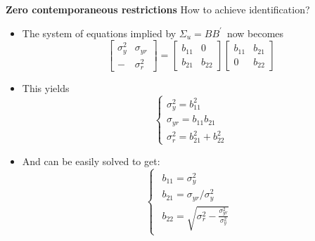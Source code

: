 \documentclass[10pt,english,t,aspectratio=169,ignorenonframetext]{beamer}
\begin{document}
\begin{frame}
{\textbf{Zero contemporaneous restrictions }}{How to achieve identification?}
\vspace{-.25cm}

\begin{itemize}
\item The system of equations implied by $\Sigma _{u}=BB^{\prime }$\ now
becomes 
\begin{equation*}
\left[ 
\begin{array}{cc}
\sigma _{y}^{2} & \sigma _{yr} \\ 
- & \sigma _{r}^{2}%
\end{array}%
\right] =\left[ 
\begin{array}{cc}
b_{11} & 0 \\ 
b_{21} & b_{22}%
\end{array}%
\right] \left[ 
\begin{array}{cc}
b_{11} & b_{21} \\ 
0 & b_{22}%
\end{array}%
\right]
\end{equation*}
\pause

\item This yields%
\begin{equation*}
\left\{ 
\begin{array}{l}
\sigma _{y}^{2}=b_{11}^{2} \\ 
\sigma _{yr}=b_{11}b_{21} \\ 
\sigma _{r}^{2}=b_{21}^{2}+b_{22}^{2}%
\end{array}%
\right.
\end{equation*}
\pause

\item And can be easily solved to get:%
\begin{equation*}
\left\{ 
\begin{array}{l}
\begin{array}{c}
b_{11}=\sigma _{y}^{2} \\ 
b_{21}=\sigma _{yr}/\sigma _{y}^{2} \\ 
b_{22}=\sqrt{\sigma _{r}^{2}-\frac{\sigma _{yr}^{2}}{\sigma _{y}^{2}}}%
\end{array}%
\end{array}%
\right.
\end{equation*}
\end{itemize}
\end{frame}

\end{document}
